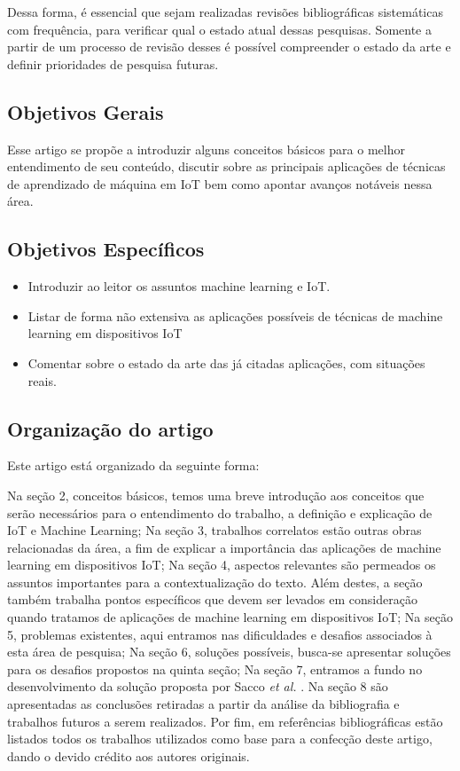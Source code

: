 \documentclass[12pt]{article}
\begin{document}
Dessa forma, é essencial que sejam realizadas revisões bibliográficas sistemáticas com frequência, para verificar qual o estado atual dessas pesquisas. Somente a partir de um processo de revisão desses é possível compreender o estado da arte e definir prioridades de pesquisa futuras.

\subsection{Objetivos Gerais}

Esse artigo se propõe a introduzir alguns conceitos básicos para o melhor entendimento de seu conteúdo, discutir sobre as principais aplicações de técnicas de aprendizado de máquina em IoT bem como apontar avanços notáveis nessa área.

\subsection{Objetivos Específicos}

\begin{itemize}
    \item Introduzir ao leitor os assuntos machine learning e IoT.
    \item Listar de forma não extensiva as aplicações possíveis de técnicas de machine learning em dispositivos IoT
    \item Comentar sobre o estado da arte das já citadas aplicações, com situações reais. 
\end{itemize}

\subsection{Organização do artigo}

Este artigo está organizado da seguinte forma:

Na seção 2, conceitos básicos, temos uma breve introdução aos conceitos que serão necessários para o entendimento do trabalho, a definição e explicação de IoT e Machine Learning; Na seção 3, trabalhos correlatos estão outras obras relacionadas da área, a fim de explicar a importância das aplicações de machine learning em dispositivos IoT; Na seção 4, aspectos relevantes são permeados os assuntos importantes para a contextualização do texto. Além destes, a seção também trabalha pontos específicos que devem ser levados em consideração quando tratamos de aplicações de machine learning em dispositivos IoT; Na seção 5, problemas existentes, aqui entramos nas dificuldades e desafios associados à esta área de pesquisa; Na seção 6, soluções possíveis, busca-se apresentar soluções para os desafios propostos na quinta seção; Na seção 7, entramos a fundo no desenvolvimento da solução proposta por Sacco \emph{et al.} \cite{sacco}. Na seção 8 são apresentadas as conclusões retiradas a partir da análise da bibliografia e trabalhos futuros a serem realizados. Por fim, em referências bibliográficas estão listados todos os trabalhos utilizados como base para a confecção deste artigo, dando o devido crédito aos autores originais.
\end{document}
